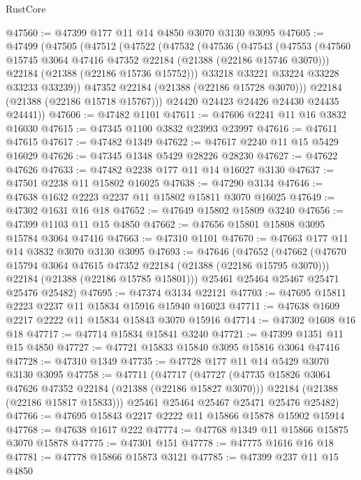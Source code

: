 \begin{lexlean}{RustCore}
\begin{coremodule}
@47560 := @47399 @177 @11 @14 @4850 @3070 @3130 @3095
@47605 := @47499
    (@47505
      (@47512
        (@47522
          (@47532
            (@47536
              (@47543
                (@47553
                  (@47560 @15745 @3064 @47416 @47352 @22184 (@21388 (@22186 @15746 @3070)))
                  @22184
                  (@21388 (@22186 @15736 @15752)))
                @33218
                @33221
                @33224
                @33228
                @33233
                @33239))
            @47352
            @22184
            (@21388 (@22186 @15728 @3070)))
          @22184
          (@21388 (@22186 @15718 @15767)))
        @24420
        @24423
        @24426
        @24430
        @24435
        @24441))
@47606 := @47482 @1101
@47611 := @47606 @2241 @11 @16 @3832 @16030
@47615 := @47345 @1100 @3832 @23993 @23997
@47616 := @47611 @47615
@47617 := @47482 @1349
@47622 := @47617 @2240 @11 @15 @5429 @16029
@47626 := @47345 @1348 @5429 @28226 @28230
@47627 := @47622 @47626
@47633 := @47482 @2238 @177 @11 @14 @16027 @3130
@47637 := @47501 @2238 @11 @15802 @16025
@47638 := @47290 @3134
@47646 := @47638 @1632 @2223 @2237 @11 @15802 @15811 @3070 @16025
@47649 := @47302 @1631 @16 @18
@47652 := @47649 @15802 @15809 @3240
@47656 := @47399 @1103 @11 @15 @4850
@47662 := @47656 @15801 @15808 @3095 @15784 @3064 @47416
@47663 := @47310 @1101
@47670 := @47663 @177 @11 @14 @3832 @3070 @3130 @3095
@47693 := @47646
    (@47652
      (@47662
        (@47670 @15794 @3064 @47615 @47352 @22184 (@21388 (@22186 @15795 @3070)))
        @22184
        (@21388 (@22186 @15785 @15801)))
      @25461
      @25464
      @25467
      @25471
      @25476
      @25482)
@47695 := @47374 @3134 @22121
@47703 := @47695 @15811 @2223 @2237 @11 @15834 @15916 @15940 @16023
@47711 := @47638 @1609 @2217 @2222 @11 @15834 @15843 @3070 @15916
@47714 := @47302 @1608 @16 @18
@47717 := @47714 @15834 @15841 @3240
@47721 := @47399 @1351 @11 @15 @4850
@47727 := @47721 @15833 @15840 @3095 @15816 @3064 @47416
@47728 := @47310 @1349
@47735 := @47728 @177 @11 @14 @5429 @3070 @3130 @3095
@47758 := @47711
    (@47717
      (@47727
        (@47735 @15826 @3064 @47626 @47352 @22184 (@21388 (@22186 @15827 @3070)))
        @22184
        (@21388 (@22186 @15817 @15833)))
      @25461
      @25464
      @25467
      @25471
      @25476
      @25482)
@47766 := @47695 @15843 @2217 @2222 @11 @15866 @15878 @15902 @15914
@47768 := @47638 @1617 @222
@47774 := @47768 @1349 @11 @15866 @15875 @3070 @15878
@47775 := @47301 @151
@47778 := @47775 @1616 @16 @18
@47781 := @47778 @15866 @15873 @3121
@47785 := @47399 @237 @11 @15 @4850

\end{coremodule}
\end{lexlean}
